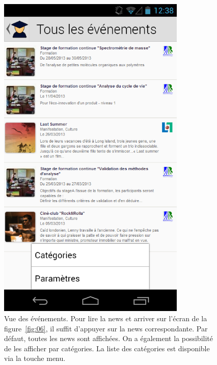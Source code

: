 \documentclass [pdftex,12pt] {report}
\begin{document}
\begin{figure}
\begin{minipage}[t]{8cm}
    \includegraphics[width=0.8\textwidth]{resources/ui_preview/04}
    \caption{Vue des événements. Pour lire la news et arriver sur l'écran de la figure~\ref{fig:06}, il suffit d'appuyer sur la news correspondante. Par défaut, toutes les news sont affichées. On a également la possibilité de les afficher par catégories. La liste des catégories est disponible via la touche menu.}
    \label{fig:04}
  \end{minipage}
  \hspace{-60pt}
\end{figure}
\end{document}
